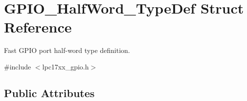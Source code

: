 \hypertarget{struct_g_p_i_o___half_word___type_def}{\section{\-G\-P\-I\-O\-\_\-\-Half\-Word\-\_\-\-Type\-Def \-Struct \-Reference}
\label{struct_g_p_i_o___half_word___type_def}
}


\-Fast \-G\-P\-I\-O port half-\/word type definition.  




{\ttfamily \#include $<$lpc17xx\-\_\-gpio.\-h$>$}

\subsection*{\-Public \-Attributes}

